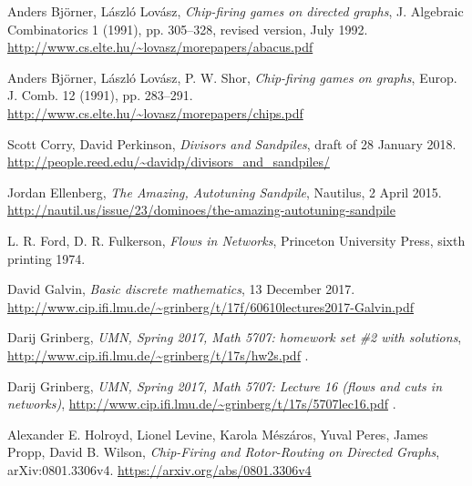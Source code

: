 \documentclass[numbers=enddot,12pt,final,onecolumn,notitlepage]{scrartcl}%
\theoremstyle{definition}
\begin{document}
\begin{thebibliography}{99999999}

Anders Bj\"orner, L\'aszl\'o Lov\'asz,
\textit{Chip-firing games on directed graphs},
J. Algebraic Combinatorics 1 (1991), pp. 305--328,
revised version, July 1992.
\newline\url{http://www.cs.elte.hu/~lovasz/morepapers/abacus.pdf}

Anders Bj\"orner, L\'aszl\'o Lov\'asz, P. W. Shor,
\textit{Chip-firing games on graphs},
Europ. J. Comb. 12 (1991), pp. 283--291.
\newline\url{http://www.cs.elte.hu/~lovasz/morepapers/chips.pdf}

Scott Corry, David Perkinson,
\textit{Divisors and Sandpiles},
draft of 28 January 2018.
\newline\url{http://people.reed.edu/~davidp/divisors_and_sandpiles/}

Jordan Ellenberg,
\textit{The Amazing, Autotuning Sandpile},
Nautilus, 2 April 2015.
\newline\url{http://nautil.us/issue/23/dominoes/the-amazing-autotuning-sandpile}

L. R. Ford, D. R. Fulkerson,
\textit{Flows in Networks},
Princeton University Press,
sixth printing 1974.

David Galvin, \textit{Basic discrete mathematics}, 13
December 2017.\newline
\url{http://www.cip.ifi.lmu.de/~grinberg/t/17f/60610lectures2017-Galvin.pdf}

Darij Grinberg,
\textit{UMN, Spring 2017, Math 5707: homework set \#2 with solutions},
\newline\url{http://www.cip.ifi.lmu.de/~grinberg/t/17s/hw2s.pdf} .

Darij Grinberg,
\textit{UMN, Spring 2017, Math 5707: Lecture 16 (flows and cuts in networks)},
\newline\url{http://www.cip.ifi.lmu.de/~grinberg/t/17s/5707lec16.pdf} .

Alexander E. Holroyd, Lionel Levine, Karola M\'esz\'aros,
Yuval Peres, James Propp, David B. Wilson,
\textit{Chip-Firing and Rotor-Routing on Directed Graphs},
arXiv:0801.3306v4.
\newline\url{https://arxiv.org/abs/0801.3306v4}


\end{thebibliography}
\end{document}
